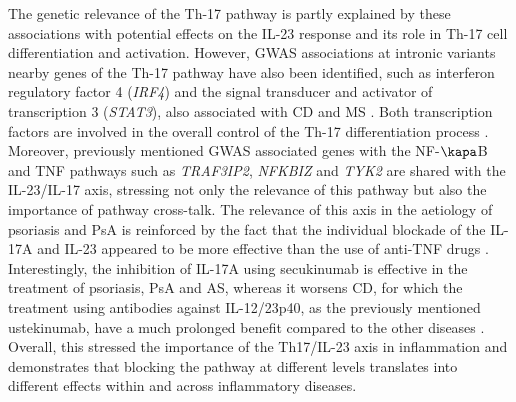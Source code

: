 The genetic relevance of the Th-17 pathway is partly explained by these associations with potential effects on the IL-23 response and its role in Th-17 cell differentiation and activation. However, GWAS associations at intronic variants nearby genes of the Th-17 pathway have also been identified, such as interferon regulatory factor 4 (\textit{IRF4}) and the signal transducer and activator of transcription 3 (\textit{STAT3}), also associated with CD and MS \parencite{Tsoi2012, Immunobase}. Both transcription factors are involved in the overall control of the Th-17 differentiation process \parencite{Huber2008,Harris2007}. Moreover, previously mentioned GWAS associated genes with the NF-$\kapa$B and TNF pathways such as \textit{TRAF3IP2}, \textit{NFKBIZ} and \textit{TYK2} are shared with the IL-23/IL-17 axis, stressing not only the relevance of this pathway but also the importance of pathway cross-talk. The relevance of this axis in the aetiology of psoriasis and PsA is reinforced by the fact that the individual blockade of the IL-17A and IL-23 appeared to be more effective than the use of anti-TNF drugs \parencite{Griffiths2015,Blauvelt2017}. Interestingly, the inhibition of IL-17A using secukinumab is effective in the treatment of psoriasis, PsA and AS, whereas it worsens CD, for which the treatment using antibodies against IL-12/23p40, as the previously mentioned ustekinumab, have a much prolonged benefit compared to the other diseases \parencite{Patel2012,Hueber2012,Blauvelt2017b}. Overall, this stressed the importance of the Th17/IL-23 axis in inflammation and demonstrates that blocking the pathway at different levels translates into different effects within and across inflammatory diseases.  


